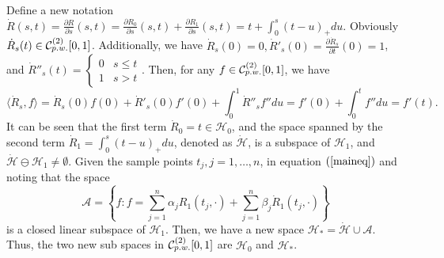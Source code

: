 Define a new notation $\dot{R}(s,t)=\frac{\partial R}{\partial s}(s,t)=\frac{\partial R_0}{\partial s}(s,t)+\frac{\partial R_1}{\partial s}(s,t)=t+\int_0^s(t-u)_+du$. Obviously $\dot{R}_s(t) \in \mathcal{C}_{\footnotesize p.w.}^{(2)}[0,1]$. Additionally, we have $\dot{R}_s(0)=0, \dot{R}'_s(0)=\frac{\partial \dot{R}_s}{\partial t}(0)=1$, and $ \dot{R}''_s(t)=\begin{cases}
0 & s\leq t \\ 1 & s>t \end{cases}$. Then, for any $f\in \mathcal{C}_{\footnotesize p.w.}^{(2)}[0,1]$, we have 
\begin{equation*}
\langle \dot{R}_s,f\rangle =\dot{R}_s(0)f(0)+\dot{R}'_s(0)f'(0)+\int_0^1\dot{R}''_s f''	 du=f'(0)+\int_0^t f''du=f'(t).
\end{equation*}
%
It can be seen that the first term $\dot{R}_0=t\in \mathcal{H}_0$, and the space spanned by the second term $\dot{R}_1=\int_0^s(t-u)_+du$, denoted as $\mathcal{\dot{H}}$, is a subspace of $\mathcal{H}_1$, and $\mathcal{\dot{H}} \ominus \mathcal{H}_1\neq \emptyset$. Given the sample points $t_j, j=1, \ldots, n$, in equation $(\ref{maineq})$ and noting that the space
\begin{equation*}
\mathcal{A}=\left\lbrace f: f=\sum_{j=1}^{n}\alpha_jR_1(t_j,\cdot)+\sum_{j=1}^{n}\beta_j\dot{R}_1(t_j,\cdot)\right\rbrace 
\end{equation*}
is a closed linear subspace of $\mathcal{H}_1$. Then, we have a new space $\mathcal{H}_*=\mathcal{\dot{H}} \cup \mathcal{A}$. Thus, the two new sub spaces in $\mathcal{C}_{\footnotesize p.w.}^{(2)}[0,1]$ are $\mathcal{H}_0$ and $\mathcal{H}_*$.



